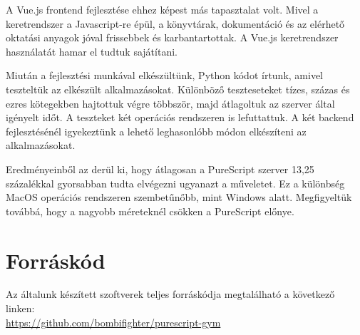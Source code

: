 \documentclass[12pt]{article}
\begin{document}
A Vue.js frontend fejlesztése ehhez képest más tapasztalat volt. Mivel a keretrendszer a Javascript-re épül,  a könyvtárak, dokumentáció és az elérhető oktatási anyagok jóval frissebbek és karbantartottak. A Vue.js keretrendszer használatát hamar el tudtuk sajátítani.

Miután a fejlesztési munkával elkészültünk, Python kódot írtunk, amivel teszteltük az elkészült alkalmazásokat. Különböző teszteseteket tízes, százas és ezres kötegekben hajtottuk végre többször, majd átlagoltuk az szerver által igényelt időt. A teszteket két operációs rendszeren is lefuttattuk. A két backend fejlesztésénél igyekeztünk a lehető leghasonlóbb módon elkészíteni az alkalmazásokat.

Eredményeinből az derül ki, hogy átlagosan a PureScript szerver 13,25 százalékkal gyorsabban tudta elvégezni ugyanazt a műveletet. Ez a különbség MacOS operációs rendszeren szembetűnőbb, mint Windows alatt. Megfigyeltük továbbá, hogy a nagyobb méreteknél csökken a PureScript előnye.


\newpage
\section*{Forráskód}

Az általunk készített szoftverek teljes forráskódja megtalálható a következő linken:\\ \url{ https://github.com/bombifighter/purescript-gym}

\end{document}
